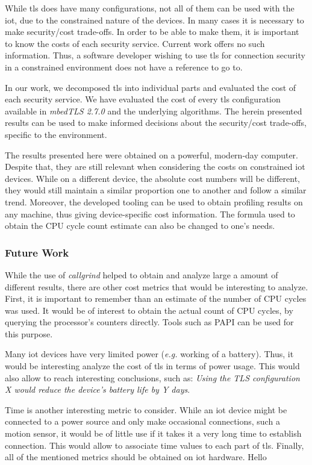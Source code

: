 \documentclass{llncs}
\begin{document}
While \gls{tls} does have many configurations, not all of them can be used with the \gls{iot},
due to the constrained nature of the devices. In many cases it is necessary to make security/cost
trade-offs. In order to be able to make them, it is important to know the costs of each security
service. Current work offers no such information. Thus, a software developer wishing to use \gls{tls}
for connection security in a constrained environment does not have a reference to go to.

In our work, we decomposed \gls{tls} into individual parts and evaluated the cost of each security service.
We have evaluated the cost of every \gls{tls} configuration available in \textit{mbedTLS 2.7.0} and the underlying
algorithms. The herein presented results can be used to make informed decisions about the security/cost trade-offs,
specific to the environment.

The results presented here were obtained on a powerful, modern-day computer. Despite that, they are still
relevant when considering the costs on constrained \gls{iot} devices. While on a different device, the absolute cost 
numbers will be different, they would still maintain a similar proportion one to another and follow a similar trend.
Moreover, the developed tooling can be used to obtain profiling results on any machine, thus giving device-specific 
cost information. The formula used to obtain the CPU cycle count estimate can also be changed to one's needs.

\subsubsection{Future Work}

While the use of \textit{callgrind} helped to obtain and analyze large a amount of different results, there are other
cost metrics that would be interesting to analyze. First, it is important to remember than an estimate of the number
of CPU cycles was used. It would be of interest to obtain the actual count of CPU cycles, by querying the
processor's counters directly. Tools such as PAPI\cite{dongarra2001using} can be used for this purpose.

Many \gls{iot} devices have very limited power (\textit{e.g.} working of a battery). Thus, it would be interesting
analyze the cost of \gls{tls} in terms of power usage. This would also allow to reach interesting conclusions, such as:
\textit{Using the TLS configuration X would reduce the device's battery life by Y days}.

Time is another interesting metric to consider. While an \gls{iot} device might be connected to a power source and
only make occasional connections, such a motion sensor, it would be of little use if it takes it a very long time
to establish connection. This would allow to associate time values to each part of \gls{tls}.
Finally, all of the mentioned metrics should be obtained on \gls{iot} hardware. Hello

%
\nocite{*}


%
\printglossary[style=long]
%
\end{document}
